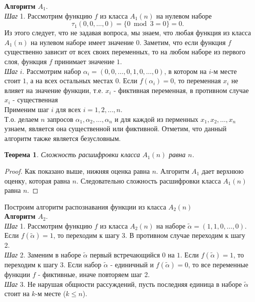 \documentclass[oneside, final, 14pt]{extreport}
\newtheorem{thm}{Теорема}
\begin{document}
	\noindent\textbf{Алгоритм $A_1$}. \\
	\emph{Шаг} 1. Рассмотрим функцию $f$  из класса $A_1(n)$ на нулевом наборе
	\[
		\tau_1(0, 0, \ldots, 0) =  \{0 \bmod  3 = 0\} = 0.
	\]
	Из этого следует, что не задавая вопроса, мы знаем, что любая функция из класса $A_1(n)$ на нулевом наборе имеет значение $0$.
	Заметим, что если функция $f$ существенно зависит от всех своих переменных, то на любом наборе из первого слоя, функция $f$ принимает значение $1$.\\
	\emph{Шаг} $i$. Рассмотрим набор $\alpha_i = (0, 0,  \ldots, 0, 1, 0, \ldots, 0)$, в котором на $i$-м месте стоит $1$, а на всех остальных местах $0$.
	Если $f(\alpha_i) = 0$, то переменная $x_i$ не влияет на значение функции, т.е. $x_i$ - 
	фиктивная переменная, в противном случае $x_i$ - существенная \\
	Применим шаг $i$ для всех $i = 1, 2, \ldots, n$. \\ 
	\noindent Т.о. делаем $n$  запросов $\alpha_1, \alpha_2, \ldots, \alpha_n$ и для каждой из перменных $x_1, x_2, \ldots, x_n$ узнаем, является она существенной 
	или фиктивной. Отметим, что данный алгоритм также  является безусловным.\par
	\begin{thm} 
		Сложность расшифровки класса $A_1(n)$ равна $n$. 
	\end{thm}
	\begin{proof}
		Как показано выше, нижняя оценка равна $n$. Алгоритм $A_1$ дает верхнюю оценку, которая равна $n$. Следовательно сложность расшифровки класса
		$A_1(n)$ равна $n$.
	\end{proof} \par
	\noindent Построим алгоритм распознавания функции из класса $A_2(n)$  \\
	\noindent\textbf{Алгоритм $A_2$}. \\
	\emph{Шаг} 1. Рассмотрим функцию $f$ из класса $A_2(n)$  на наборе $\tilde{\alpha} = (1, 1, 0, \ldots, 0)$. Если $f(\tilde{\alpha}) = 1$, то переходим к шагу 3. 
	В противном	случае переходим к шагу 2. \\
	\emph{Шаг} 2. Заменим в  наборе $\tilde{\alpha}$ первый встречающийся $0$ на  $1$. Если $f(\tilde{\alpha}) = 1$, то переходим к шагу 3. Если набор
	 $\tilde{\alpha}$ - единичный и $f(\tilde{\alpha}) = 0$, то все переменные функции $f$ - фиктивные, иначе повторяем шаг 2.\\
	\emph{Шаг} 3. Не нарушая общности рассуждений, пусть последняя единица в наборе $\tilde{\alpha}$ стоит на $k$-м месте ($k \leq n$).
\end{document}
